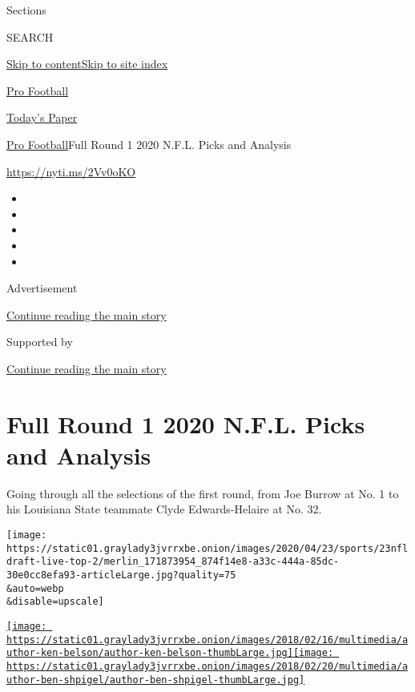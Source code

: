 Sections

SEARCH

\protect\hyperlink{site-content}{Skip to
content}\protect\hyperlink{site-index}{Skip to site index}

\href{https://www.nytimes3xbfgragh.onion/section/sports/football}{Pro
Football}

\href{https://myaccount.nytimes3xbfgragh.onion/auth/login?response_type=cookie\&client_id=vi}{}

\href{https://www.nytimes3xbfgragh.onion/section/todayspaper}{Today's
Paper}

\href{/section/sports/football}{Pro Football}\textbar{}Full Round 1 2020
N.F.L. Picks and Analysis

\url{https://nyti.ms/2Vv0oKO}

\begin{itemize}
\item
\item
\item
\item
\item
\end{itemize}

Advertisement

\protect\hyperlink{after-top}{Continue reading the main story}

Supported by

\protect\hyperlink{after-sponsor}{Continue reading the main story}

\hypertarget{full-round-1-2020-nfl-picks-and-analysis}{%
\section{Full Round 1 2020 N.F.L. Picks and
Analysis}\label{full-round-1-2020-nfl-picks-and-analysis}}

Going through all the selections of the first round, from Joe Burrow at
No. 1 to his Louisiana State teammate Clyde Edwards-Helaire at No. 32.

\texttt{[image: https://static01.graylady3jvrrxbe.onion/images/2020/04/23/sports/23nfldraft-live-top-2/merlin\_171873954\_874f14e8-a33c-444a-85dc-30e0cc8efa93-articleLarge.jpg?quality=75\\\&auto=webp\\\&disable=upscale]}

\href{https://www.nytimes3xbfgragh.onion/by/ken-belson}{\texttt{[image: https://static01.graylady3jvrrxbe.onion/images/2018/02/16/multimedia/author-ken-belson/author-ken-belson-thumbLarge.jpg]}}\href{https://www.nytimes3xbfgragh.onion/by/ben-shpigel}{\texttt{[image: https://static01.graylady3jvrrxbe.onion/images/2018/02/20/multimedia/author-ben-shpigel/author-ben-shpigel-thumbLarge.jpg]}}

